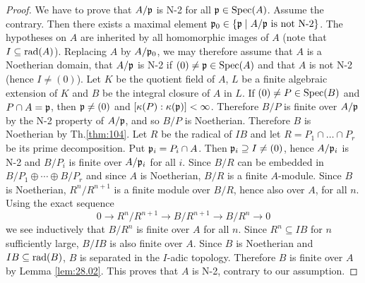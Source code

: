 \documentclass[../main]{subfiles}
\begin{document}
\begin{proof}
We have to prove that $A / \mathfrak{p}$ is N-2 for all $\mathfrak{p} \in \operatorname{Spec}(A)$. Assume the contrary. Then there exists a maximal element $\mathfrak{p}_0\in\{\mathfrak{p}\mid A /\mathfrak{p}\text{ is not N-2}\}$. The hypotheses on $A$ are inherited by all homomorphic images of $A$ (note that\newline $I \subseteq\operatorname{rad}(A)$). Replacing $A$ by $A / \mathfrak{p}_0$, we may therefore assume that $A$ is a Noetherian domain, that $A / \mathfrak{p}$ is N-2 if $(0) \neq \mathfrak{p} \in \operatorname{Spec}(A)$ and that $A$ is not N-2 (hence $I \neq (0)$). Let $K$ be the quotient field of $A$, $L$ be a finite algebraic extension of $K$ and $B$ be the integral closure of $A$ in $L$. If $(0) \neq P \in \operatorname{Spec}(B)$ and $P \cap A=\mathfrak{p}$, then $\mathfrak{p} \neq(0)$ and $[\kappa(P): \kappa(\mathfrak{p})]<\infty$. Therefore $B / P$ is finite over $A / \mathfrak{p}$ by the N-2 property of $A / \mathfrak{p}$, and so $ B / P$ is Noetherian. Therefore $B$ is Noetherian by Th.\ref{thm:104}. Let $R$ be the radical of $I B$ and let $R=P_1 \cap \ldots \cap P_r$ be its prime decomposition. Put $\mathfrak{p}_i=P_i \cap A$. Then $\mathfrak{p}_i \supseteq I \neq(0)$, hence $A / \mathfrak{p}_i$ is N-2 and $B / P_i$ is finite over $A / \mathfrak{p}_i$ for all $i$. Since $B / R$ can be embedded in $B / P_1 \oplus \cdots \oplus B / P_r$ and since $A$ is Noetherian, $B / R$ is a finite $A$-module. Since $B$ is Noetherian, $R^n / R^{n+1}$ is a finite module over $B / R$, hence also over $A$, for all $n$. Using the exact sequence \[0 \longrightarrow R^n / R^{n+1} \longrightarrow B / R^{n+1} \longrightarrow B / R^n \longrightarrow 0\] we see inductively that $B / R^n$ is finite over $A$ for all $n$. Since $R^n\subseteq IB$ for $n$ sufficiently large, $B/IB$ is also finite over $A$. Since $B$ is Noetherian and \newline $IB \subseteq \operatorname{rad}(B)$, $B$ is separated in the $I$-adic topology. Therefore $B$ is finite over $A$ by Lemma \ref{lem:28.02}. This proves that $A$ is N-2, contrary to our assumption.
\end{proof}
\end{document}
